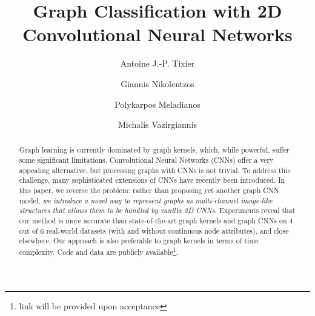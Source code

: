 \documentclass[sigconf]{acmart}
\begin{document}
\title{Graph Classification with 2D Convolutional Neural Networks}

\author{Antoine J.-P. Tixier}

\author{Giannis Nikolentzos}

\author{Polykarpos Meladianos}

\author{Michalis Vazirgiannis}

\begin{abstract}
Graph learning is currently dominated by graph kernels, which, while powerful, suffer some significant limitations. Convolutional Neural Networks (CNNs) offer a very appealing alternative, but processing graphs with CNNs is not trivial. To address this challenge, many sophisticated extensions of CNNs have recently been introduced. In this paper, we reverse the problem: rather than proposing yet another graph CNN model, \textit{we introduce a novel way to represent graphs as multi-channel image-like structures that allows them to be handled by vanilla 2D CNNs}. 
Experiments reveal that our method is more accurate than state-of-the-art graph kernels and graph CNNs on 4 out of 6 real-world datasets (with and without continuous node attributes), and close elsewhere. Our approach is also preferable to graph kernels in terms of time complexity. Code and data are publicly available\footnote{\scriptsize{link will be provided upon acceptance}}.
\end{abstract}


\maketitle
\end{document}
